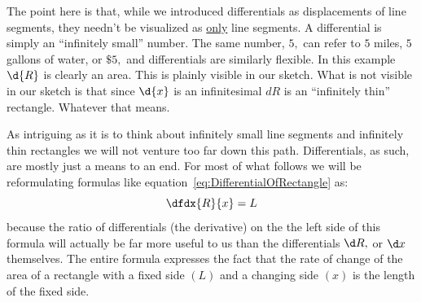 
The point here is that, while we introduced differentials as
displacements of line segments, they needn't be visualized as
\underline{only} line segments. A differential is simply an
``infinitely small'' number. The same number, $5,$ can refer
to $5$ miles, $5$ gallons of water, or $\$5,$ and differentials are
similarly flexible. In this example $\d{R}$ is clearly an
area. This is plainly visible in our sketch. What is not visible in
our sketch is that since $\d{x}$ is an infinitesimal $d{R}$  is an
``infinitely thin'' rectangle. Whatever that means.

As intriguing as it is to think about infinitely small line segments
and infinitely thin rectangles we will not venture too far down this
path. Differentials, as such, are mostly just a means to an end. For
most of what follows we will be  reformulating formulas like
equation~\ref{eq:DifferentialOfRectangle} as:
$$
\dfdx{R}{x} = L
$$ 
because the ratio of differentials (the derivative) on the the left side of this formula will
actually be far more useful to us than the differentials $\d R,$ or
$\d x$ themselves. 
The entire formula expresses the fact that the rate of change of the
area of a rectangle with a fixed side $(L)$ and a changing side $(x)$
is the length of the fixed side. 



